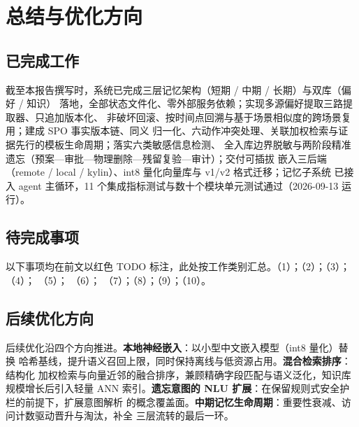 \section{总结与优化方向}\label{sec:conclusion}

\subsection{已完成工作}

截至本报告撰写时，系统已完成三层记忆架构（短期 / 中期 / 长期）与双库（偏好 / 知识）
落地，全部状态文件化、零外部服务依赖；实现多源偏好提取三路提取器、只追加版本化、
非破坏回滚、按时间点回溯与基于场景相似度的跨场景复用；建成 SPO 事实版本链、同义
归一化、六动作冲突处理、关联加权检索与证据先行的模板生命周期；落实六类敏感信息检测、
全入库边界脱敏与两阶段精准遗忘（预案—审批—物理删除—残留复验—审计）；交付可插拔
嵌入三后端（remote / local / kylin）、int8 量化向量库与 v1/v2 格式迁移；记忆子系统
已接入 agent 主循环，11 个集成指标测试与数十个模块单元测试通过（2026-09-13 运行）。

\subsection{待完成事项}

以下事项均在前文以红色 TODO 标注，此处按工作类别汇总。（1）；（2）；（3）；
（4）；
（5）；
（6）；
（7）；（8）；（9）；（10）。

\subsection{后续优化方向}

后续优化沿四个方向推进。\textbf{本地神经嵌入}：以小型中文嵌入模型（int8 量化）替换
哈希基线，提升语义召回上限，同时保持离线与低资源占用。\textbf{混合检索排序}：结构化
加权检索与向量近邻的融合排序，兼顾精确字段匹配与语义泛化，知识库规模增长后引入轻量
ANN 索引。\textbf{遗忘意图的 NLU 扩展}：在保留规则式安全护栏的前提下，扩展意图解析
的概念覆盖面。\textbf{中期记忆生命周期}：重要性衰减、访问计数驱动晋升与淘汰，补全
三层流转的最后一环。
